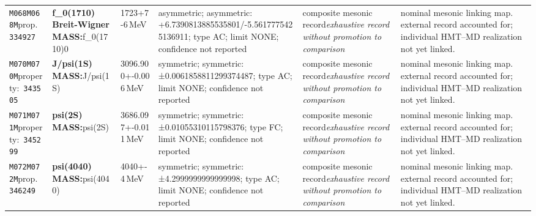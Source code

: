 \begin{landscape}
\begin{longtable}{L{1.85cm}L{4.45cm}L{2.35cm}L{4.05cm}L{3.35cm}L{7.15cm}}
\texttt{M068}\newline \texttt{M068M}\newline prop.\ \texttt{334927} & \textbf{f\_\allowbreak{}0(1710) Breit-Wigner MASS:}\newline f\_\allowbreak{}0(1710)0 & 1723+7-6\,MeV & asymmetric; asymmetric: +6.7390813885535801/-5.5617775425136911; type AC; limit NONE; confidence not reported & composite mesonic record\newline \emph{exhaustive record without promotion to comparison} & nominal mesonic linking map. external record accounted for; individual HMT--MD realization not yet linked. \\
\texttt{M070}\newline \texttt{M070M}\newline property:\ \texttt{343505} & \textbf{J/psi(1S) MASS:}\newline J/psi(1S) & 3096.900+-0.006\,MeV & symmetric; symmetric: ±0.0061858811299374487; type AC; limit NONE; confidence not reported & composite mesonic record\newline \emph{exhaustive record without promotion to comparison} & nominal mesonic linking map. external record accounted for; individual HMT--MD realization not yet linked. \\
\texttt{M071}\newline \texttt{M071M}\newline property:\ \texttt{345299} & \textbf{psi(2S) MASS:}\newline psi(2S) & 3686.097+-0.011\,MeV & symmetric; symmetric: ±0.01055310115798376; type FC; limit NONE; confidence not reported & composite mesonic record\newline \emph{exhaustive record without promotion to comparison} & nominal mesonic linking map. external record accounted for; individual HMT--MD realization not yet linked. \\
\texttt{M072}\newline \texttt{M072M}\newline prop.\ \texttt{346249} & \textbf{psi(4040) MASS:}\newline psi(4040) & 4040+-4\,MeV & symmetric; symmetric: ±4.2999999999999998; type AC; limit NONE; confidence not reported & composite mesonic record\newline \emph{exhaustive record without promotion to comparison} & nominal mesonic linking map. external record accounted for; individual HMT--MD realization not yet linked. \\

\end{longtable}
\end{landscape}
